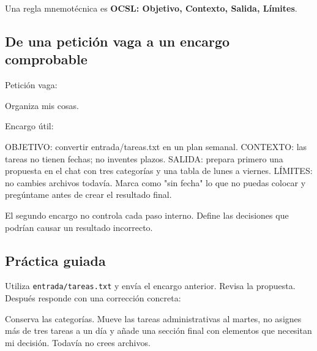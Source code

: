 \documentclass[10pt,a4paper,openany]{book}
\newenvironment{Shaded}{}{}
\newcommand{\NormalTok}[1]{#1}
\renewenvironment{Shaded}
  {\begin{tcolorbox}[
    enhanced,
    breakable,
    colback=CodeBg,
    colframe=Border,
    boxrule=0.5pt,
    arc=2mm,
    left=3mm,
    right=3mm,
    top=2.2mm,
    bottom=2.2mm,
    before skip=0.8em,
    after skip=0.9em
  ]}
  {\end{tcolorbox}}
\begin{document}
Una regla mnemotécnica es \textbf{OCSL: Objetivo, Contexto, Salida,
Límites}.

\subsection{De una petición vaga a un encargo
comprobable}\label{de-una-peticiuxf3n-vaga-a-un-encargo-comprobable}

Petición vaga:

\begin{Shaded}
\begin{Highlighting}[]
\NormalTok{Organiza mis cosas.}
\end{Highlighting}
\end{Shaded}

Encargo útil:

\begin{Shaded}
\begin{Highlighting}[]
\NormalTok{OBJETIVO: convertir entrada/tareas.txt en un plan semanal.}
\NormalTok{CONTEXTO: las tareas no tienen fechas; no inventes plazos.}
\NormalTok{SALIDA: prepara primero una propuesta en el chat con tres categorías y una}
\NormalTok{tabla de lunes a viernes.}
\NormalTok{LÍMITES: no cambies archivos todavía. Marca como "sin fecha" lo que no puedas}
\NormalTok{colocar y pregúntame antes de crear el resultado final.}
\end{Highlighting}
\end{Shaded}

El segundo encargo no controla cada paso interno. Define las decisiones
que podrían causar un resultado incorrecto.

\subsection{Práctica guiada}\label{pruxe1ctica-guiada}

Utiliza \texttt{entrada/tareas.txt} y envía el encargo anterior. Revisa
la propuesta. Después responde con una corrección concreta:

\begin{Shaded}
\begin{Highlighting}[]
\NormalTok{Conserva las categorías. Mueve las tareas administrativas al martes, no asignes}
\NormalTok{más de tres tareas a un día y añade una sección final con elementos que necesitan}
\NormalTok{mi decisión. Todavía no crees archivos.}
\end{Highlighting}
\end{Shaded}
\end{document}
